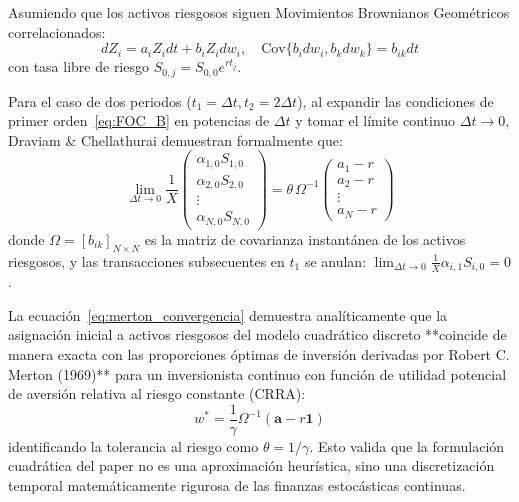 \documentclass[11pt,a4paper]{report}
\numberwithin{equation}{chapter}
\begin{document}
Asumiendo que los activos riesgosos siguen Movimientos Brownianos Geométricos correlacionados:
\begin{equation}
    dZ_i = a_i Z_i dt + b_i Z_i dw_i, \quad \mathrm{Cov}\{b_i dw_i, b_k dw_k\} = b_{ik} dt
\end{equation}
con tasa libre de riesgo $S_{0,j} = S_{0,0} e^{r t_j}$.

Para el caso de dos periodos ($t_1 = \Delta t, t_2 = 2 \Delta t$), al expandir las condiciones de primer orden~\eqref{eq:FOC_B} en potencias de $\Delta t$ y tomar el límite continuo $\Delta t \to 0$, Draviam \& Chellathurai demuestran formalmente que:
\begin{equation}
    \lim_{\Delta t \to 0} \frac{1}{X} \begin{pmatrix}
        \alpha_{1,0} S_{1,0} \\
        \alpha_{2,0} S_{2,0} \\
        \vdots \\
        \alpha_{N,0} S_{N,0}
    \end{pmatrix} = \theta \, \Omega^{-1} \begin{pmatrix}
        a_1 - r \\
        a_2 - r \\
        \vdots \\
        a_N - r
    \end{pmatrix} \label{eq:merton_convergencia}
\end{equation}
donde $\Omega = [b_{ik}]_{N \times N}$ es la matriz de covarianza instantánea de los activos riesgosos, y las transacciones subsecuentes en $t_1$ se anulan: $\lim_{\Delta t \to 0} \frac{1}{X} \alpha_{i,1} S_{i,0} = 0$.

\begin{notebox}
La ecuación~\eqref{eq:merton_convergencia} demuestra analíticamente que la asignación inicial a activos riesgosos del modelo cuadrático discreto **coincide de manera exacta con las proporciones óptimas de inversión derivadas por Robert C. Merton (1969)** para un inversionista continuo con función de utilidad potencial de aversión relativa al riesgo constante (CRRA):
\begin{equation}
    w^* = \frac{1}{\gamma} \Omega^{-1} (\mathbf{a} - r \mathbf{1})
\end{equation}
identificando la tolerancia al riesgo como $\theta = 1/\gamma$. Esto valida que la formulación cuadrática del paper no es una aproximación heurística, sino una discretización temporal matemáticamente rigurosa de las finanzas estocásticas continuas.
\end{notebox}
\end{document}

